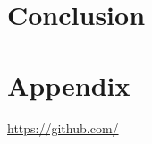 \documentclass[12pt,a4paper]{article}
\begin{document}
\clearpage

\section{Conclusion}
\label{sec:conclusion}


\clearpage
\section{Appendix}
\url{https://github.com/}
\clearpage
\cite{Cymulate_network_attacks}
\cite{UVA_scanning_pdf}


\end{document}
